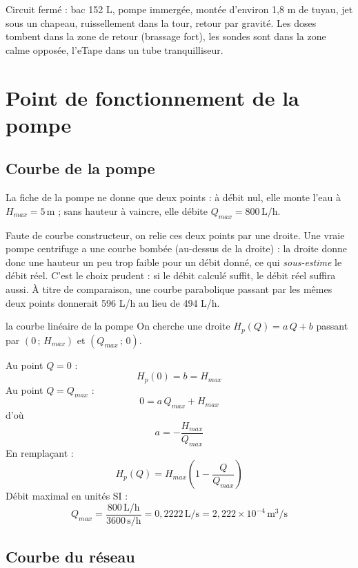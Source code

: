 \documentclass[11pt,a4paper]{article}
\newcommand{\U}[1]{\,\mathrm{#1}}
\begin{document}
\begin{resume}
Circuit fermé : bac 152 L, pompe immergée, montée d'environ 1,8 m de tuyau, jet sous un chapeau, ruissellement dans la tour, retour par gravité. Les doses tombent dans la zone de retour (brassage fort), les sondes sont dans la zone calme opposée, l'eTape dans un tube tranquilliseur.
\end{resume}

\newpage
\section{Point de fonctionnement de la pompe}
\subsection{Courbe de la pompe}

La fiche de la pompe ne donne que deux points : à débit nul, elle monte l'eau à $H_{max} = 5\U{m}$ ; sans hauteur à vaincre, elle débite $Q_{max} = 800\U{L/h}$.

\begin{hypo}
Faute de courbe constructeur, on relie ces deux points par une droite. Une vraie pompe centrifuge a une courbe bombée (au-dessus de la droite) : la droite donne donc une hauteur un peu trop faible pour un débit donné, ce qui \emph{sous-estime} le débit réel. C'est le choix prudent : si le débit calculé suffit, le débit réel suffira aussi. À titre de comparaison, une courbe parabolique passant par les mêmes deux points donnerait 596 L/h au lieu de 494 L/h.
\end{hypo}

\begin{calcul}{la courbe linéaire de la pompe}
On cherche une droite $H_p(Q) = a\,Q + b$ passant par $(0\,;\,H_{max})$ et $(Q_{max}\,;\,0)$.

Au point $Q = 0$ :
\[ H_p(0) = b = H_{max} \]
Au point $Q = Q_{max}$ :
\[ 0 = a\,Q_{max} + H_{max} \]
d'où
\[ a = -\frac{H_{max}}{Q_{max}} \]
En remplaçant :
\[ H_p(Q) = H_{max}\left(1 - \frac{Q}{Q_{max}}\right) \]
Débit maximal en unités SI :
\[ Q_{max} = \frac{800\U{L/h}}{3600\U{s/h}} = 0{,}2222\U{L/s} = 2{,}222\times10^{-4}\U{m^3/s} \]
\end{calcul}

\subsection{Courbe du réseau}
\end{document}
